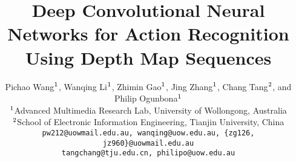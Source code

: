 \documentclass[conference]{IEEEtran}
\begin{document}
%
\title{Deep Convolutional Neural Networks for Action Recognition Using Depth Map Sequences}


\author{Pichao Wang$^{\rm 1}$, Wanqing Li$^{\rm 1}$, Zhimin Gao$^{\rm 1}$, Jing Zhang$^{\rm 1}$, Chang Tang$^{\rm 2}$, and Philip Ogunbona$^{\rm 1}$\\
$^{\rm 1}$Advanced Multimedia Research Lab, University of Wollongong, Australia\\
$^{\rm 2}$School of Electronic Information Engineering, Tianjin University, China\\
{\tt\small pw212@uowmail.edu.au, wanqing@uow.edu.au, \{zg126, jz960\}@uowmail.edu.au}\\
{\tt\small tangchang@tju.edu.cn, philipo@uow.edu.au}
}

\maketitle
\end{document}
